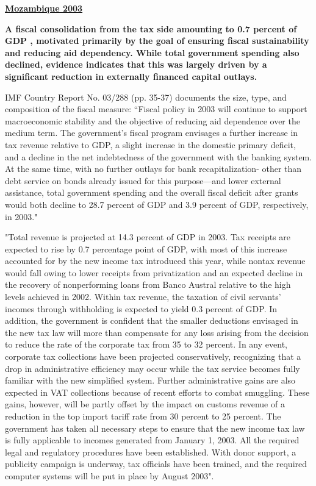 \textbf{\underline{Mozambique 2003}}

\textbf{A fiscal consolidation from the tax side amounting to 0.7 percent of GDP , motivated primarily by the goal of ensuring fiscal sustainability and reducing aid dependency. While total government spending also declined, evidence indicates that this was largely driven by a significant reduction in externally financed capital outlays.}

IMF Country Report No. 03/288 (pp. 35-37) documents the size, type, and composition of the fiscal measure: “Fiscal policy in 2003 will continue to support macroeconomic stability and the objective of reducing aid dependence over the medium term. The government's fiscal program envisages a further increase in tax revenue relative to GDP, a slight increase in the domestic primary deficit, and a decline in the net indebtedness of the government with the banking system. At the same time, with no further outlays for bank recapitalization- other than debt service on bonds already issued for this purpose—and lower external assistance, total government spending and the overall fiscal deficit after grants would both decline to 28.7 percent of GDP and 3.9 percent of GDP, respectively, in 2003." 

"Total revenue is projected at 14.3 percent of GDP in 2003. Tax receipts are expected to rise by 0.7 percentage point of GDP, with most of this increase accounted for by the new income tax introduced this year, while nontax revenue would fall owing to lower receipts from privatization and an expected decline in the recovery of nonperforming loans from Banco Austral relative to the high levels achieved in 2002. Within tax revenue, the taxation of civil servants' incomes through withholding is expected to yield 0.3 percent of GDP. In addition, the government is confident that the smaller deductions envisaged in the new tax law will more than compensate for any loss arising from the decision to reduce the rate of the corporate tax from 35 to 32 percent. In any event, corporate tax collections have been projected conservatively, recognizing that a drop in administrative efficiency may occur while the tax service becomes fully familiar with the new simplified system. Further administrative gains are also expected in VAT collections because of recent efforts to combat smuggling. These gains, however, will be partly offset by the impact on customs revenue of a reduction in the top import tariff rate from 30 percent to 25 percent. The government has taken all necessary steps to ensure that the new income tax law is fully applicable to incomes generated from January 1, 2003. All the required legal and regulatory procedures have been established. With donor support, a publicity campaign is underway, tax officials have been trained, and the required computer systems will be put in place by August 2003".

